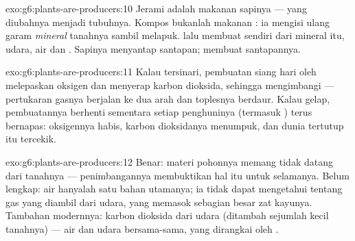 \begin{solution}{exo:g6:plants-are-producers:10}
Jerami adalah makanan sapinya ---  yang diubahnya
menjadi tubuhnya. Kompos bukanlah makanan : ia mengisi
ulang garam \emph{mineral} tanahnya sambil melapuk.  lalu
membuat  sendiri dari mineral itu, udara, air dan
. Sapinya menyantap santapan;  membuat santapannya.
\end{solution}

\begin{solution}{exo:g6:plants-are-producers:11}
Kalau tersinari, pembuatan siang hari oleh  melepaskan
oksigen dan menyerap karbon dioksida, sehingga mengimbangi 
 --- pertukaran gasnya berjalan ke dua arah dan toplesnya
berdaur. Kalau gelap, pembuatannya berhenti sementara setiap
penghuninya (termasuk ) terus bernapas: oksigennya habis,
karbon dioksidanya menumpuk, dan dunia tertutup itu tercekik.
\end{solution}

\begin{solution}{exo:g6:plants-are-producers:12}
Benar: materi pohonnya memang tidak datang dari tanahnya ---
penimbangannya membuktikan hal itu untuk selamanya. Belum lengkap: air
hanyalah satu bahan utamanya; ia tidak dapat mengetahui tentang gas
yang diambil dari udara, yang memasok sebagian besar zat kayunya.
Tambahan modernnya: karbon dioksida dari udara (ditambah sejumlah
kecil  tanahnya) --- air dan udara bersama-sama, yang
dirangkai oleh .
\end{solution}

